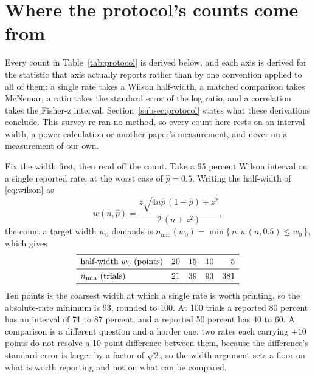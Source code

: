 \section{Where the protocol's counts come from}
\label{app:protocol}

Every count in Table~\ref{tab:protocol} is derived below, and each axis is derived for the
statistic that axis actually reports rather than by one convention applied to all of them: a single
rate takes a Wilson half-width, a matched comparison takes McNemar, a ratio takes the standard
error of the log ratio, and a correlation takes the Fisher-z interval.
Section~\ref{subsec:protocol} states what these derivations conclude. This survey re-ran no method,
so every count here rests on an interval width, a power calculation or another paper's measurement,
and never on a measurement of our own.

Fix the width first, then read off the count. Take a 95 percent Wilson interval on a single
reported rate, at the worst case of $\hat{p} = 0.5$. Writing the half-width of \eqref{eq:wilson} as
\begin{equation}
w(n,\hat{p}) = \frac{z\sqrt{4n\hat{p}\,(1-\hat{p}) + z^{2}}}{2\,(n + z^{2})},
\label{eq:halfwidth}
\end{equation}
the count a target width $w_{0}$ demands is
$n_{\min}(w_{0}) = \min\{\,n : w(n,0.5) \le w_{0}\,\}$, which gives
\begin{equation*}
\begin{array}{lrrrr}
\toprule
\text{half-width } w_{0} \text{ (points)} & 20 & 15 & 10 & 5\\
\midrule
n_{\min} \text{ (trials)} & 21 & 39 & 93 & 381\\
\bottomrule
\end{array}
\end{equation*}
Ten points is the coarsest width at which a single rate is worth printing, so the absolute-rate
minimum is 93, rounded to 100. At 100 trials a reported 80 percent has an interval of 71 to 87
percent, and a reported 50 percent has 40 to 60. A comparison is a different question and a harder
one: two rates each carrying $\pm 10$ points do not resolve a 10-point difference between them,
because the difference's standard error is larger by a factor of $\sqrt{2}$, so the width argument
sets a floor on what is worth reporting and not on what can be compared.

